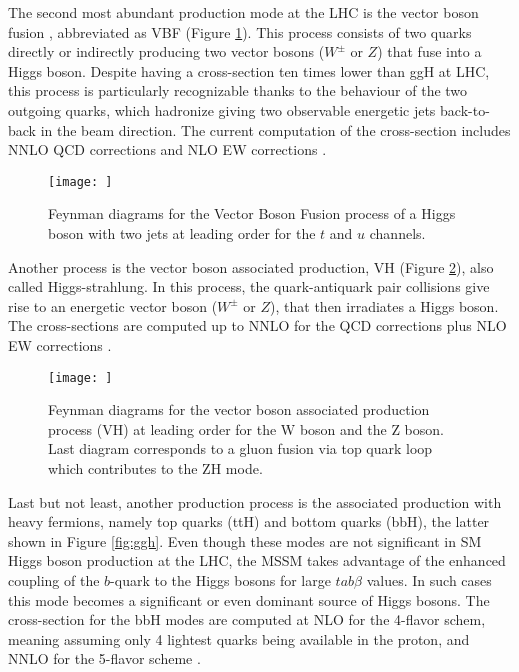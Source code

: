The second most abundant production mode at the LHC is the vector boson fusion \cite{PhysRevD.85.035002}, abbreviated as VBF (Figure \ref{fig:vbf}). This process consists of two quarks directly or indirectly producing two vector bosons ($W^{\pm}$ or $Z$) that fuse into a Higgs boson. Despite having a cross-section ten times lower than ggH at LHC, this process is particularly recognizable thanks to the behaviour of the two outgoing quarks, which hadronize giving two observable energetic jets back-to-back in the beam direction. The current computation of the cross-section includes NNLO QCD corrections and NLO EW corrections \cite{deFlorian:2227475}.

\begin{figure}
    \centering
    \texttt{[image: ]}
    \caption{Feynman diagrams for the Vector Boson Fusion process of a Higgs boson with two jets at leading order for the $t$ and $u$ channels.}
    \label{fig:vbf}
\end{figure}

Another process is the vector boson associated production, VH (Figure \ref{fig:vh}), also called Higgs-strahlung. In this process, the quark-antiquark pair collisions give rise to an energetic vector boson ($W^{\pm}$ or $Z$), that then irradiates a Higgs boson. The cross-sections are computed up to NNLO for the QCD corrections plus NLO EW corrections \cite{deFlorian:2227475}.

\begin{figure}
    \centering
    \texttt{[image: ]}
    \caption{Feynman diagrams for the vector boson associated production process (VH) at leading order for the W boson and the Z boson. Last diagram corresponds to a gluon fusion via top quark loop which contributes to the ZH mode.}
    \label{fig:vh}
\end{figure}

Last but not least, another production process is the associated production with heavy fermions, namely top quarks (ttH) and bottom quarks (bbH), the latter shown in Figure \ref{fig:ggh}. Even though these modes are not significant in SM Higgs boson production at the LHC, the MSSM takes advantage of the enhanced coupling of the $b$-quark to the Higgs bosons for large $tab \beta$ values. In such cases this mode becomes a significant or even dominant source of Higgs bosons. The cross-section for the bbH modes are computed at NLO for the 4-flavor schem, meaning assuming only 4 lightest quarks being available in the proton, and NNLO for the 5-flavor scheme \cite{deFlorian:2227475}.

